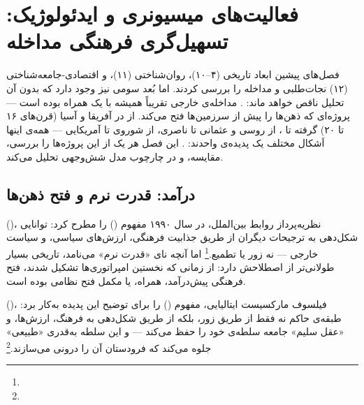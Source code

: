 \chapter{فعالیت‌های میسیونری و ایدئولوژیک: تسهیل‌گری فرهنگی مداخله}
\label{ch:missionary}

\begin{tcolorbox}[mybox, title={چکیده‌ی فصل}]
فصل‌های پیشین ابعاد تاریخی (۴–۱۰)، روان‌شناختی (۱۱)، و اقتصادی-جامعه‌شناختی (۱۲) نجات‌طلبی و مداخله را بررسی کردند. اما بُعد سومی نیز وجود دارد که بدون آن تحلیل ناقص خواهد ماند: . مداخله‌ی خارجی تقریباً همیشه با یک  همراه بوده است — پروژه‌ای که ذهن‌ها را پیش از سرزمین‌ها فتح می‌کند. از  در آفریقا و آسیا (قرن‌های ۱۶ تا ۲۰) گرفته تا ، از  روسی و  عثمانی تا  ناصری، از  شوروی تا  آمریکایی — همه‌ی اینها اَشکال مختلف یک پدیده‌ی واحدند: . این فصل هر یک از این پروژه‌ها را بررسی، مقایسه، و در چارچوب مدل شش‌وجهی تحلیل می‌کند.
\end{tcolorbox}

\section{درآمد: قدرت نرم و فتح ذهن‌ها}
\label{sec:ch13-intro}

 ()، نظریه‌پرداز روابط بین‌الملل، در سال ۱۹۹۰ مفهوم  () را مطرح کرد: توانایی شکل‌دهی به ترجیحات دیگران از طریق جذابیت فرهنگی، ارزش‌های سیاسی، و سیاست خارجی — نه زور یا تطمیع.\footnote{} اما آنچه نای «قدرت نرم» می‌نامد، تاریخی بسیار طولانی‌تر از اصطلاحش دارد: از زمانی که نخستین امپراتوری‌ها تشکیل شدند، فتح فرهنگی پیش‌درآمد، همراه، یا مکمل فتح نظامی بوده است.

 ()، فیلسوف مارکسیست ایتالیایی، مفهوم  () را برای توضیح این پدیده به‌کار برد: طبقه‌ی حاکم نه فقط از طریق زور، بلکه از طریق شکل‌دهی به فرهنگ، ارزش‌ها، و «عقل سلیم» جامعه سلطه‌ی خود را حفظ می‌کند — و این سلطه به‌قدری «طبیعی» جلوه می‌کند که فرودستان آن را درونی می‌سازند.\footnote{}

